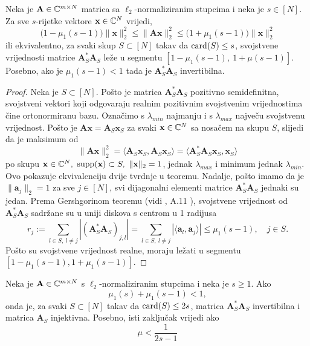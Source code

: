 \documentclass[a4paper,twoside,12pt]{memoir} %
\newcommand{\vect}[1]{\mathbf{#1}}
\renewcommand{\vec}{\vect}
\newcommand{\card}{\text{\normalfont{card}}}
\newcommand{\supp}{\text{\normalfont{supp}}}
\newcommand{\norm}[1]{\|{#1}\|}
\begin{document}
\begin{thm}\label{tm:5:3}
    Neka je $\vec A \in \C^{m \times N}$ matrica sa $\ell_2$-normaliziranim stupcima i neka je $s \in [N]$. Za sve $s$-rijetke vektore $\vec x \in \C^N$ vrijedi,
    \begin{equation*}
        \big(1-\mu_1(s-1)\big) \norm{\vec x}_2^2 \leq \norm{\vec{Ax}}_2^2 \leq \big(1+\mu_1(s-1)\big) \norm{\vec x}_2^2
    \end{equation*}
    ili ekvivalentno, za svaki skup $S \subset [N]$ takav da $\card(S) \leq s$, svojstvene vrijednosti matrice $\vec A^*_S \vec A_S$ le\v{z}e u segmentu $[1-\mu_1(s-1),\ 1+\mu(s-1)]$. Posebno, ako je $\mu_1(s-1) < 1$ tada je $\vec A^*_S \vec A_S$ invertibilna.
\end{thm}
\begin{proof}
    Neka je $S \subset [N]$. Po\v{s}to je matrica $\vec A^*_S \vec A_S$ pozitivno semidefinitna, svojstveni vektori koji odgovaraju realnim pozitivnim svojstvenim vrijednostima \v{c}ine ortonormiranu bazu. Ozna\v{c}imo s $\lambda_{min}$ najmanju i s $\lambda_{max}$ najve\v{c}u svojstvenu vrijednost. Po\v{s}to je $\vec{Ax} = \vec A_S \vec x_S$ za svaki $\vec x \in \C^N$ sa nosa\v{c}em na skupu $S$, slijedi da je maksimum od
    \begin{equation*}
        \norm{\vec{Ax}}_2^2 = \langle \vec A_S \vec x_S, \vec A_S \vec x_S  \rangle = \langle \vec A^*_S \vec A_S \vec x_S, \vec x_S \rangle
    \end{equation*}
    po skupu ${\vec x \in \C^N,\ \supp (\vec x) \subset S,\ \norm{\vec x}_2 = 1}$, jednak $\lambda_{max}$ i minimum jednak $\lambda_{min}$. Ovo pokazuje ekvivalenciju dvije tvrdnje u teoremu. Nadalje, po\v{s}to imamo da je $\norm{\vec a_j}_2 = 1$ za sve $j \in [N]$, svi dijagonalni elementi matrice $\vec A^*_S \vec A_S$ jednaki su jedan. Prema Gershgorinom teoremu (vidi \cite{gerschgorin31}, A.11 \cite{foucart13}), svojstvene vrijednost od $\vec A^*_S \vec A_S$ sadr\v{z}ane su u uniji diskova s centrom u 1 radijusa
    \begin{equation*}
        r_j := \sum_{l \in S,\ l \neq j} |(\vec A^*_S \vec A_S)_{j,l}| = \sum_{l \in S,\ l \neq j} |\langle \vec a_l, \vec a_j \rangle| \leq \mu_1 (s-1),\quad j \in S.
    \end{equation*}
    \newpage
    Po\v{s}to su svojstvene vrijednost realne, moraju le\v{z}ati u segmentu $[1-\mu_1(s-1), 1+ \mu_1(s-1)]$.
\end{proof}
\begin{cor}\label{kor:5:4}
    Neka je $\vec A \in \C^{m \times N}$ s $\ell_2$-normaliziranim stupcima i neka je $s \geq 1$. Ako  
    \begin{equation*}
        \mu_1(s) + \mu_1(s-1) < 1, 
    \end{equation*}
    onda je, za svaki $S \subset [N]$ takav da $\card(S) \leq 2s$, matrica $\vec A^*_S \vec A_S$ invertibilna i matrica $\vec A_S$ injektivna. Posebno, isti zaklju\v{c}ak vrijedi ako
    \begin{equation*}
        \mu < \frac{1}{2s - 1}  
    \end{equation*}
\end{cor}
\end{document}
